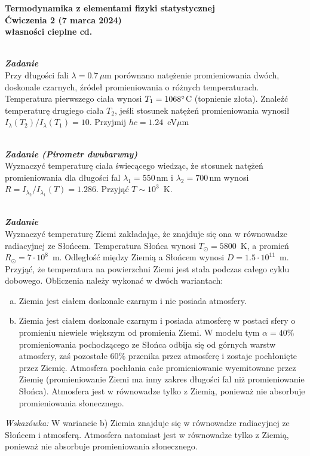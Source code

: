 \documentclass[11pt,a4paper]{article}
\newcounter{zadanie}\newcommand{\zadanie}[1][]{\addtocounter{zadanie}{1} ~\\  {\bf \emph{Zadanie \arabic{zadanie} #1 }} \\}
\begin{document}
\vspace*{-1.8cm}

\begin{centering}
\bf{\Large{Termodynamika z elementami fizyki statystycznej}}\\
Ćwiczenia 2 (7 marca 2024)\\[1mm]
własności cieplne cd. \\
\end{centering}

\zadanie
Przy długości fali $\lambda = 0.7\,\mu$m porównano natężenie promieniowania dwóch,
doskonale czarnych, źródeł promieniowania o różnych temperaturach.
Temperatura pierwszego ciała wynosi $T_1 = 1068 \degree$C (topnienie złota). 
Znaleźć temperaturę drugiego ciała $T_2$, jeśli stosunek natężeń promieniowania 
wynosił $I_\lambda (T_2)/I_\lambda (T_1) = 10$.
Przyjmij $hc = 1.24$~eV$\mu$m

\zadanie [(Pirometr dwubarwny)]
Wyznaczyć temperaturę ciała świecącego wiedząc, że stosunek natężeń promieniowania dla długości fal
$\lambda_1=550$\,nm i $\lambda_2=700$\,nm wynosi $R=I_{\lambda_2}/I_{\lambda_1}(T)=1.286$.
Przyjąć $T \sim 10^{3}$~K.

\zadanie

Wyznaczyć temperaturę Ziemi zakładając, że znajduje się ona w równowadze radiacyjnej ze
Słońcem. Temperatura Słońca wynosi $T_\odot = 5800$~K, a promień $R_\odot = 7 \cdot 10^8$~m.
Odległość między Ziemią a Słońcem wynosi $D = 1.5 \cdot 10^{11}$~m. 
Przyjąć, że temperatura na powierzchni Ziemi jest stała podczas całego cyklu dobowego.
Obliczenia należy wykonać w dwóch wariantach:\\
\begin{enumerate}[a)]
        \item Ziemia jest ciałem doskonale czarnym i nie posiada atmosfery.
        \item Ziemia jest ciałem doskonale czarnym i posiada atmosferę w postaci sfery o promieniu niewiele większym od promienia Ziemi. 
        W modelu tym $\alpha=40\%$ promieniowania pochodzącego ze Słońca odbija się od górnych warstw atmosfery, zaś pozostałe $60\%$ 
        przenika przez atmosferę i zostaje pochłonięte przez Ziemię. Atmosfera pochłania całe promieniowanie wyemitowane przez Ziemię
  (promieniowanie Ziemi ma inny zakres długości fal niż promieniowanie Słońca). Atmosfera jest w równowadze tylko z Ziemią, 
  ponieważ nie absorbuje promieniowania słonecznego.
\end{enumerate}
{\it Wskazówka: }
W wariancie b) Ziemia znajduje się w równowadze radiacyjnej ze Słońcem i atmosferą. 
Atmosfera natomiast jest w równowadze tylko z Ziemią, ponieważ nie absorbuje promieniowania słonecznego.
\end{document}
